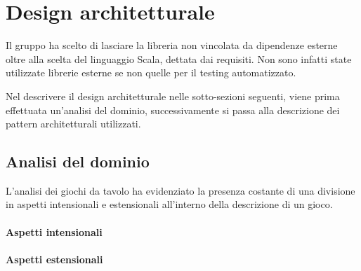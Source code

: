 \section{Design architetturale}




Il gruppo ha scelto di lasciare la libreria non vincolata da dipendenze esterne oltre alla scelta del linguaggio Scala, dettata dai requisiti.
%
Non sono infatti state utilizzate librerie esterne se non quelle per il testing automatizzato.

Nel descrivere il design architetturale nelle sotto-sezioni seguenti, viene prima effettuata un'analisi del dominio, successivamente si passa alla descrizione dei pattern architetturali utilizzati.

\subsection{Analisi del dominio}
L'analisi dei giochi da tavolo ha evidenziato la presenza costante di una divisione in aspetti intensionali e estensionali all'interno della descrizione di un gioco.
%
\paragraph{Aspetti intensionali}
\paragraph{Aspetti estensionali}
%

